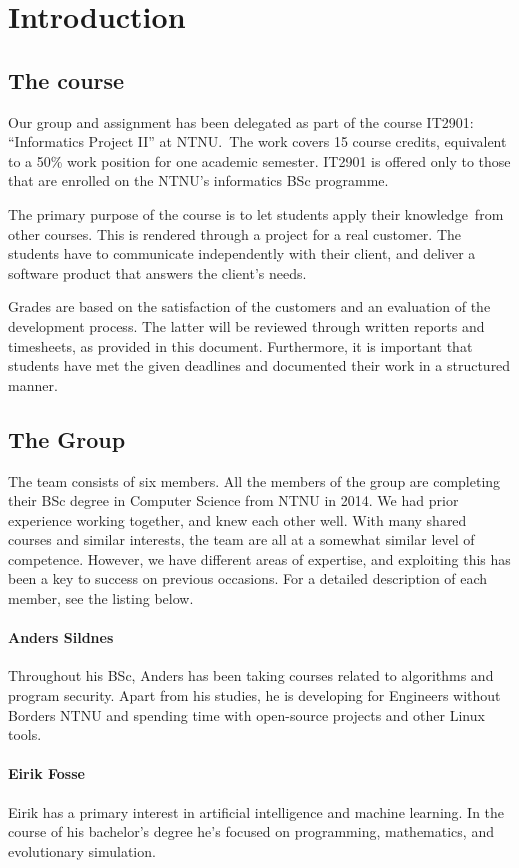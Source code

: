\chapter{Introduction}
\section{The course}\label{section:course}
Our group and assignment has been delegated as part of the course
IT2901: ``Informatics Project II''
at NTNU.\ The work covers 15 course credits, equivalent to a 50\% work
position for one academic semester. IT2901 is offered only to those
that are enrolled on the NTNU's informatics BSc
programme.

The primary purpose of the course is to let students apply their
knowledge\ from other courses. This is rendered through a project for a
real customer. The students have to communicate independently with
their client, and deliver a software product that answers the
client's needs. 

Grades are based on the satisfaction of the customers and an evaluation
of the development process. The latter will be reviewed through written
reports and timesheets, as provided in this document. Furthermore, it
is important that students have met the given deadlines and documented
their work in a structured manner.

\section{The Group}
The team consists of six members. All the members of the group are
completing their BSc degree in Computer Science from NTNU in 2014. We
had prior experience working together, and knew each other well. With
many shared courses and similar interests, the team are all at a
somewhat similar level of competence. However, we have different areas
of expertise, and exploiting this has been a key to success on previous
occasions. For a detailed description of each member, see the listing
below.

\subsubsection*{Anders Sildnes}
Throughout his BSc, Anders has been taking courses related to algorithms
and program security. Apart from his studies, he is developing for
Engineers without Borders NTNU and spending time with open-source
projects and other Linux tools.

\subsubsection{Eirik Fosse}
Eirik has a primary interest in artificial intelligence and machine
learning. In the course of his bachelor's degree
he's focused on programming, mathematics, and
evolutionary simulation.

